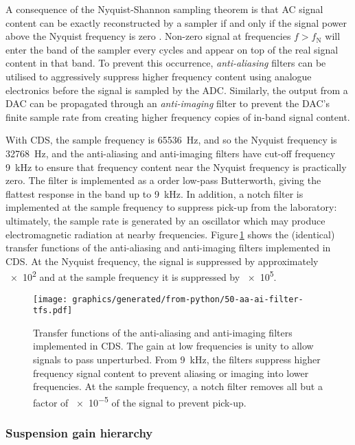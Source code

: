 A consequence of the Nyquist-Shannon sampling theorem is that \gls{AC} signal content can be exactly reconstructed by a sampler if and only if the signal power above the Nyquist frequency is zero \cite{Horowitz2015}. Non-zero signal at frequencies $f > f_{\text{N}}$ will enter the band of the sampler every  cycles and appear on top of the real signal content in that band. To prevent this occurrence, \emph{anti-aliasing} filters can be utilised to aggressively suppress higher frequency content using analogue electronics before the signal is sampled by the \gls{ADC}. Similarly, the output from a \gls{DAC} can be propagated through an \emph{anti-imaging} filter to prevent the \gls{DAC}'s finite sample rate from creating higher frequency copies of in-band signal content.

With \gls{CDS}, the sample frequency is \SI{65536}{\hertz}, and so the Nyquist frequency is \SI{32768}{\hertz}, and the anti-aliasing and anti-imaging filters have cut-off frequency \SI{9}{\kilo\hertz} to ensure that frequency content near the Nyquist frequency is practically zero. The filter is implemented as a  order low-pass Butterworth, giving the flattest response in the band up to \SI{9}{\kilo\hertz}. In addition, a notch filter is implemented at the sample frequency to suppress pick-up from the laboratory: ultimately, the sample rate is generated by an oscillator which may produce electromagnetic radiation at nearby frequencies. Figure\,\ref{fig:aa-ai-filter-tfs} shows the (identical) transfer functions of the anti-aliasing and anti-imaging filters implemented in \gls{CDS}. At the Nyquist frequency, the signal is suppressed by approximately \SI{e2}{} and at the sample frequency it is suppressed by \SI{e5}{}.

\begin{figure}
  \centering
  \texttt{[image: graphics/generated/from-python/50-aa-ai-filter-tfs.pdf]}
  \caption[Anti-aliasing and anti-imaging filter transfer functions]{\label{fig:aa-ai-filter-tfs}Transfer functions of the anti-aliasing and anti-imaging filters implemented in CDS. The gain at low frequencies is unity to allow signals to pass unperturbed. From \SI{9}{\kilo\hertz}, the filters suppress higher frequency signal content to prevent aliasing or imaging into lower frequencies. At the sample frequency, a notch filter removes all but a factor of \SI{e-5}{} of the signal to prevent pick-up.}
\end{figure}

\subsubsection{\label{sec:sus-gain-hierarchy}Suspension gain hierarchy}

